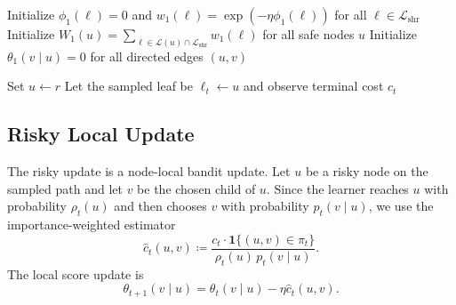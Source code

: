 \documentclass{article}
\begin{document}
\begin{algorithm}[t]
\caption{\textsc{BarrierShare}}
\label{alg:barriershare}

Initialize $\phi_1(\ell)=0$ and $w_1(\ell)=\exp(-\eta \phi_1(\ell))$ for all $\ell\in\mathcal{L}_{\mathrm{shr}}$\;
Initialize $W_1(u)=\sum_{\ell\in\mathcal{L}(u)\cap \mathcal{L}_{\mathrm{shr}}} w_1(\ell)$ for all safe nodes $u$\;
Initialize $\theta_1(v\mid u)=0$ for all directed edges $(u,v)$\;

Set $u \leftarrow r$\;
Let the sampled leaf be $\ell_t \leftarrow u$ and observe terminal cost $c_t$\;


\end{algorithm}

\subsection{Risky Local Update}
\label{sec:barriershare_risky_update}

The risky update is a node-local bandit update. Let $u$ be a risky node on the sampled path and let $v$ be the chosen child of $u$. Since the learner reaches $u$ with probability $\rho_t(u)$ and then chooses $v$ with probability $p_t(v\mid u)$, we use the importance-weighted estimator
\begin{equation}
    \widehat{c}_t(u,v)
    \coloneqq
    \frac{c_t \cdot \mathbf{1}\{(u,v)\in\pi_t\}}{\rho_t(u)\,p_t(v\mid u)}.
    \label{eq:iw_estimator}
\end{equation}
The local score update is
\begin{equation}
    \theta_{t+1}(v\mid u)
    =
    \theta_t(v\mid u) - \eta \widehat{c}_t(u,v).
    \label{eq:risky_local_update}
\end{equation}
\end{document}
